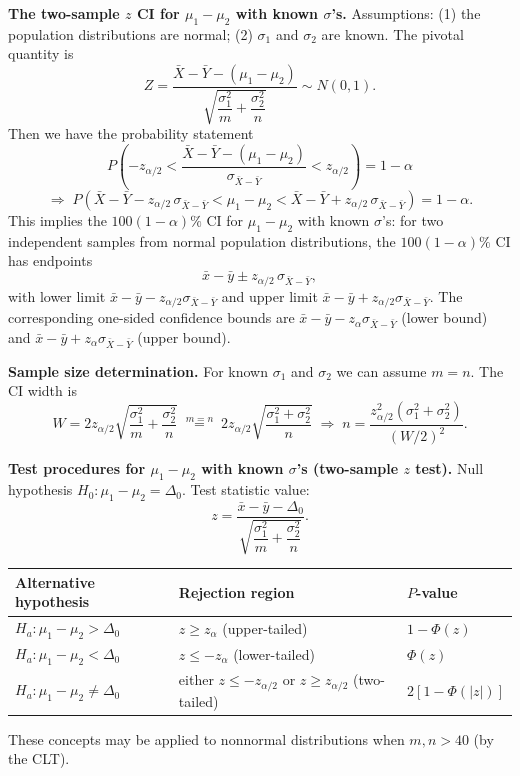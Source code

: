 \textbf{The two-sample $z$ CI for $\mu_1-\mu_2$ with known $\sigma$'s.}
Assumptions: (1) the population distributions are normal; (2) $\sigma_1$ and $\sigma_2$ are known.
The pivotal quantity is
\[
Z = \frac{\bar{X}-\bar{Y}-(\mu_1-\mu_2)}{\sqrt{\dfrac{\sigma_1^2}{m}+\dfrac{\sigma_2^2}{n}}} \sim N(0,1).
\]
Then we have the probability statement
\[
P\!\left(-z_{\alpha/2} < \frac{\bar{X}-\bar{Y}-(\mu_1-\mu_2)}{\sigma_{\bar{X}-\bar{Y}}} < z_{\alpha/2}\right) = 1-\alpha
\]
\[
\Rightarrow\; P\!\left(\bar{X}-\bar{Y}-z_{\alpha/2}\,\sigma_{\bar{X}-\bar{Y}} < \mu_1-\mu_2 < \bar{X}-\bar{Y}+z_{\alpha/2}\,\sigma_{\bar{X}-\bar{Y}}\right) = 1-\alpha .
\]
This implies the $100(1-\alpha)\%$ CI for $\mu_1-\mu_2$ with known $\sigma$'s: for two independent samples from normal
population distributions, the $100(1-\alpha)\%$ CI has endpoints
\[
\bar{x}-\bar{y} \pm z_{\alpha/2}\,\sigma_{\bar{X}-\bar{Y}},
\]
with lower limit $\bar{x}-\bar{y}-z_{\alpha/2}\sigma_{\bar{X}-\bar{Y}}$ and upper limit $\bar{x}-\bar{y}+z_{\alpha/2}\sigma_{\bar{X}-\bar{Y}}$.
The corresponding one-sided confidence bounds are
$\bar{x}-\bar{y}-z_\alpha\sigma_{\bar{X}-\bar{Y}}$ (lower bound) and $\bar{x}-\bar{y}+z_\alpha\sigma_{\bar{X}-\bar{Y}}$ (upper bound).

\textbf{Sample size determination.} For known $\sigma_1$ and $\sigma_2$ we can assume $m=n$. The CI width is
\[
W = 2z_{\alpha/2}\sqrt{\frac{\sigma_1^2}{m}+\frac{\sigma_2^2}{n}}
\;\overset{m=n}{=}\; 2z_{\alpha/2}\sqrt{\frac{\sigma_1^2+\sigma_2^2}{n}}
\;\Rightarrow\; n = \frac{z_{\alpha/2}^2(\sigma_1^2+\sigma_2^2)}{(W/2)^2}.
\]

\textbf{Test procedures for $\mu_1-\mu_2$ with known $\sigma$'s (two-sample $z$ test).}
Null hypothesis $H_0:\mu_1-\mu_2=\Delta_0$. Test statistic value:
\[
z = \frac{\bar{x}-\bar{y}-\Delta_0}{\sqrt{\dfrac{\sigma_1^2}{m}+\dfrac{\sigma_2^2}{n}}}.
\]

\begin{center}
\begin{tabular}{lll}
\toprule
Alternative hypothesis & Rejection region & $P$-value\\
\midrule
$H_a:\mu_1-\mu_2>\Delta_0$   & $z\ge z_\alpha$ (upper-tailed) & $1-\Phi(z)$\\
$H_a:\mu_1-\mu_2<\Delta_0$   & $z\le -z_\alpha$ (lower-tailed) & $\Phi(z)$\\
$H_a:\mu_1-\mu_2\ne\Delta_0$ & either $z\le -z_{\alpha/2}$ or $z\ge z_{\alpha/2}$ (two-tailed) & $2[1-\Phi(|z|)]$\\
\bottomrule
\end{tabular}
\end{center}
These concepts may be applied to nonnormal distributions when $m,n>40$ (by the CLT).

